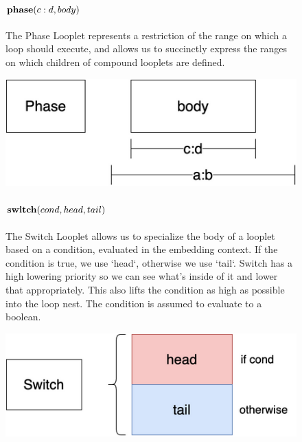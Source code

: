 \begin{figure}[ht]
    \begin{minipage}[c]{0.6\linewidth}
        \paragraph{$\text{\textbf{phase}}(c:d, body)$} The Phase Looplet represents a
        restriction of the range on which a loop should execute, and allows us
        to succinctly express the ranges on which children of compound looplets
        are defined.
    \end{minipage}%
    \begin{minipage}[c]{0.4\linewidth}
        \centering
        \includegraphics[scale=0.25]{Looplets-phase.png}
    \end{minipage}
    \begin{minipage}[c]{0.6\linewidth}
        \paragraph{$\text{\textbf{switch}}(cond, head, tail)$} The Switch Looplet allows
        us to specialize the body of a looplet based on a condition, evaluated
        in the embedding context. If the condition is true, we use `head`,
        otherwise we use `tail`. Switch has a high lowering priority so we can
        see what's inside of it and lower that appropriately. This also lifts
        the condition as high as possible into the loop nest. The condition is
        assumed to evaluate to a boolean.
    \end{minipage}%
    \begin{minipage}[c]{0.4\linewidth}
        \centering
        \includegraphics[scale=0.25]{Looplets-switch.png}
    \end{minipage}
    \begin{minipage}[c]{0.6\linewidth}

\end{minipage}
\end{figure}
